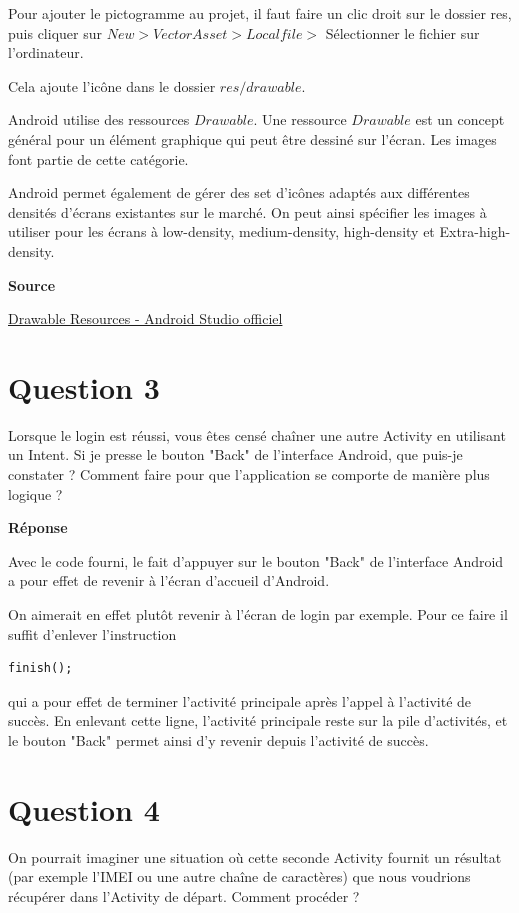\documentclass[francais,12pt]{article}
\begin{document}
		Pour ajouter le pictogramme au projet, il faut faire un clic droit sur le dossier res, puis cliquer sur $New > Vector Asset > Local file >$ Sélectionner le fichier sur l'ordinateur. 
		
		Cela ajoute l'icône dans le dossier $res/drawable. $
		
		Android utilise des ressources $Drawable$. Une ressource $Drawable$ est un concept général pour un élément graphique qui peut être dessiné sur l'écran. Les images font partie de cette catégorie. 
		
		Android permet également de gérer des set d'icônes adaptés aux différentes densités d'écrans existantes sur le marché. On peut ainsi spécifier les images à utiliser pour les écrans à low-density, medium-density, high-density et Extra-high-density. 
		
		\textbf{Source}

        \href{https://developer.android.com/guide/topics/resources/drawable-resource.html}{Drawable Resources - Android Studio officiel}
		
	\section*{Question 3}
		Lorsque le login est réussi, vous êtes censé chaîner une autre Activity en utilisant un Intent. Si je presse le bouton "Back" de l'interface Android, que puis-je constater ? Comment faire pour que l'application se comporte de manière plus logique ?
		
		{\color[rgb]{0,0.5,0.23}\textbf{Réponse}}
        
		Avec le code fourni, le fait d'appuyer sur le bouton "Back" de l'interface Android a pour effet de revenir à l'écran d'accueil d'Android. 
		
		On aimerait en effet plutôt revenir à l'écran de login par exemple. Pour ce faire il suffit d'enlever l'instruction 
		
		\begin{lstlisting}[style=javaCode]
		finish();
		\end{lstlisting}
		
		qui a pour effet de terminer l'activité principale après l'appel à l'activité de succès. En enlevant cette ligne, l'activité principale reste sur la pile d'activités, et le bouton "Back" permet ainsi d'y revenir depuis l'activité de succès.
		
		
	\section*{Question 4}
		 On pourrait imaginer une situation où cette seconde Activity fournit un résultat (par exemple l'IMEI ou une autre chaîne de caractères) que nous voudrions récupérer dans l'Activity de départ. Comment procéder ? 
		 
\end{document}

